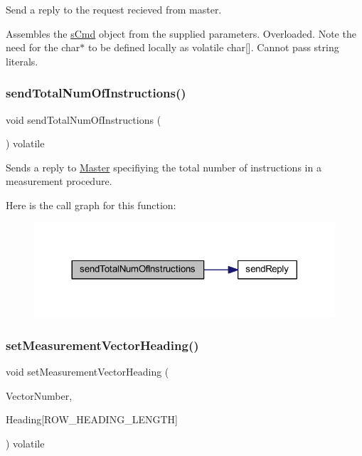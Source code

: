 Send a reply to the request recieved from master. 

Assembles the \mbox{\hyperlink{structs_cmd}{s\+Cmd}} object from the supplied parameters. Overloaded. Note the need for the char$\ast$ to be defined locally as volatile char\mbox{[}\mbox{]}. Cannot pass string literals. \mbox{\label{class_master_aa68bb1327d506c42b6b7ab54fd73ca62}} 
\subsubsection{\texorpdfstring{sendTotalNumOfInstructions()}{sendTotalNumOfInstructions()}}
{\footnotesize\ttfamily void send\+Total\+Num\+Of\+Instructions (\begin{DoxyParamCaption}\item[{void}]{ }\end{DoxyParamCaption}) volatile}



Sends a reply to \mbox{\hyperlink{class_master}{Master}} specifiying the total number of instructions in a measurement procedure. 

Here is the call graph for this function\+:
\nopagebreak
\begin{figure}[H]
\begin{center}
\leavevmode
\includegraphics[width=317pt]{class_master_aa68bb1327d506c42b6b7ab54fd73ca62_cgraph}
\end{center}
\end{figure}
\mbox{\label{class_master_a49e434ca3d09d56bac2a2d45c86661ac}} 
\subsubsection{\texorpdfstring{setMeasurementVectorHeading()}{setMeasurementVectorHeading()}}
{\footnotesize\ttfamily void set\+Measurement\+Vector\+Heading (\begin{DoxyParamCaption}\item[{\mbox{\hyperlink{_s_p_i___instruction_set_8h_a9d8048399836e11887f85cc8dc3d75d5}{Measurement\+Vectors}}}]{Vector\+Number,  }\item[{volatile char}]{Heading\mbox{[}\+R\+O\+W\+\_\+\+H\+E\+A\+D\+I\+N\+G\+\_\+\+L\+E\+N\+G\+T\+H\mbox{]} }\end{DoxyParamCaption}) volatile}



